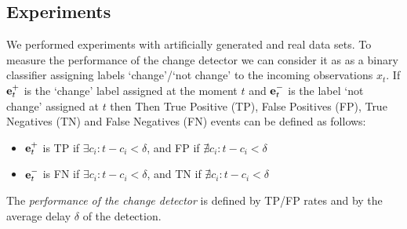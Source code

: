 \subsection{Experiments}
\label{sec:experiments}
We performed experiments with artificially generated and real
data sets.
To measure the performance of the change detector we can consider it as as a binary classifier assigning labels `change'/`not change' to the incoming observations $x_t$.
If
$\mathbf{e}_{t}^{+}$ is the `change' label assigned at the moment $t$
and
$\mathbf{e}_{t}^{-}$ is the label `not change' assigned at $t$
then
Then True Positive (TP), False Positives (FP), True Negatives (TN) and False Negatives (FN) events can be defined as follows:
\begin{itemize}[leftmargin=*]\setlength\itemsep{0em}
    \item $\mathbf{e}_{t}^{+}$ is TP if $\exists c_i:t-c_i<\delta$, and FP if $\nexists c_i:t-c_i<\delta$
    \item $\mathbf{e}_{t}^{-}$ is FN if $\exists c_i:t-c_i <\delta$, and TN if $\nexists c_i:t-c_i<\delta$
\end{itemize}
The \textit{performance of the change detector} is defined by TP/FP rates and by the average delay $\delta$ of the detection.

